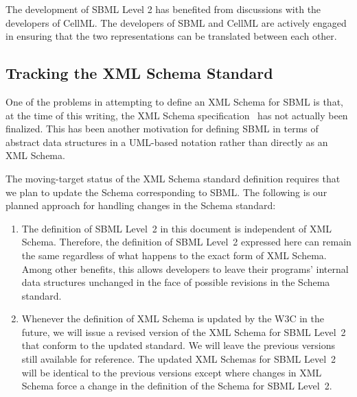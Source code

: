 \documentclass[10pt,twocolumntoc]{cekarticle}
\begin{document}
The development of SBML Level 2 has benefited from discussions
with the developers of CellML. The developers of SBML and CellML
are actively engaged in ensuring that the two representations can
be translated between each other.

\subsection{Tracking the XML Schema Standard}
\label{sec:tracking-xml}

One of the problems in attempting to define an XML Schema for SBML is that,
at the time of this writing, the XML Schema
specification~\citep{biron:2000,thompson:2000} has not actually been
finalized.  This has been another motivation for defining SBML in terms of
abstract data structures in a UML-based notation rather than directly as an
XML Schema.

The moving-target status of the XML Schema standard definition requires
that we plan to update the Schema corresponding to SBML.  The following
is our planned approach for handling changes in the Schema standard:
\begin{enumerate}

\item The definition of SBML Level~2 in this document is
independent of XML
  Schema.  Therefore, the definition of SBML Level~2 expressed here can
  remain the same regardless of what happens to the exact form of XML
  Schema.  Among other benefits, this allows developers to leave their
  programs' internal data structures unchanged in the face of possible
  revisions in the Schema standard.

%
\item Whenever the definition of XML Schema is updated by the W3C in the
  future, we will issue a revised version of the XML Schema for SBML
  Level~2 that conform to the updated standard.  We will leave the previous
  versions still available for reference.  The updated XML Schemas for SBML
  Level~2 will be identical to the previous versions except where changes
  in XML Schema force a change in the definition of the Schema for SBML
  Level~2.

\end{enumerate}
\end{document}
